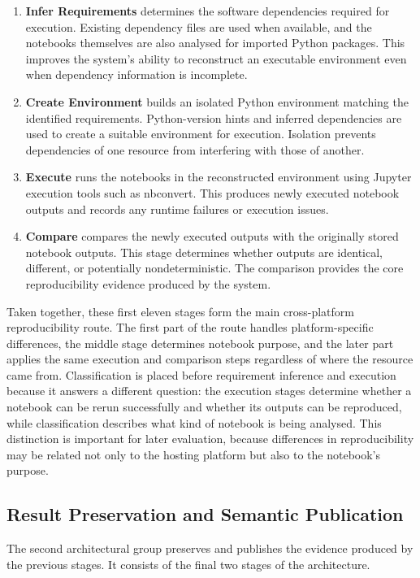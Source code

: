 \begin{enumerate}[label=\arabic*.,leftmargin=1.2cm,itemsep=0.25em,topsep=0.2em]
\item \textbf{Infer Requirements} determines the software dependencies required for execution. Existing dependency files are used when available, and the notebooks themselves are also analysed for imported Python packages. This improves the system's ability to reconstruct an executable environment even when dependency information is incomplete.
\item \textbf{Create Environment} builds an isolated Python environment matching the identified requirements. Python-version hints and inferred dependencies are used to create a suitable environment for execution. Isolation prevents dependencies of one resource from interfering with those of another.
\item \textbf{Execute} runs the notebooks in the reconstructed environment using Jupyter execution tools such as nbconvert. This produces newly executed notebook outputs and records any runtime failures or execution issues.
\item \textbf{Compare} compares the newly executed outputs with the originally stored notebook outputs. This stage determines whether outputs are identical, different, or potentially nondeterministic. The comparison provides the core reproducibility evidence produced by the system.
\end{enumerate}

Taken together, these first eleven stages form the main cross-platform reproducibility route. The first part of the route handles platform-specific differences, the middle stage determines notebook purpose, and the later part applies the same execution and comparison steps regardless of where the resource came from. Classification is placed before requirement inference and execution because it answers a different question: the execution stages determine whether a notebook can be rerun successfully and whether its outputs can be reproduced, while classification describes what kind of notebook is being analysed. This distinction is important for later evaluation, because differences in reproducibility may be related not only to the hosting platform but also to the notebook's purpose.

\subsection*{Result Preservation and Semantic Publication}

The second architectural group preserves and publishes the evidence produced by the previous stages. It consists of the final two stages of the architecture.

